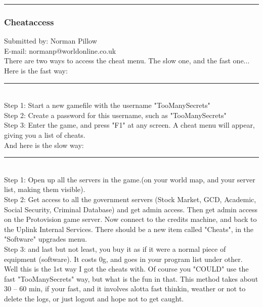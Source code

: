 \documentclass[11pt,twoside,a4paper]{book}
\begin{document}
\begin{center} \rule{0.85\textwidth}{0.01cm} \end{center}

\clearpage

\subsubsection{Cheataccess}

Submitted by: Norman Pillow ~\\
E-mail: normanp@worldonline.co.uk ~\\

There are two ways to access the cheat menu. The slow one, and the fast one... ~\\

Here is the fast way: ~\\
\rule{0.25\textwidth}{0.01cm}~\\
Step 1: Start a new gamefile with the username "TooManySecrets" ~\\

Step 2: Create a password for this username, such as "TooManySecrets" ~\\

Step 3: Enter the game, and press "F1" at any screen. A cheat menu will appear, giving you a list of cheats. ~\\

And here is the slow way: ~\\
\rule{0.25\textwidth}{0.01cm}~\\
Step 1: Open up all the servers in the game.(on your world map, and your server list, making them visible). ~\\

Step 2: Get access to all the government servers (Stock Market, GCD, Academic, Social Security, Criminal Database) and get admin access. Then get admin access on the Protovision game server. Now connect to the credits machine, and back to the Uplink Internal Services. There should be a new item called "Cheats", in the "Software" upgrades menu. ~\\

Step 3: and last but not least, you buy it as if it were a normal piece of equipment (software). It costs 0g, and goes in your program list under other. ~\\

Well this is the 1st way I got the cheats with. Of course you "COULD" use the fast "TooManySecrets" way, but what is the fun in that. This method takes about 30 -- 60 min, if your fast, and it involves alotta fast thinkin, weather or not to delete the logs, or just logout and hope not to get caught. %
\end{document}
